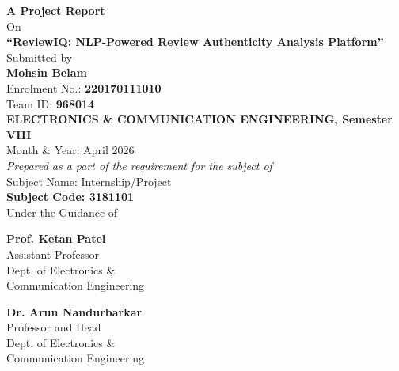 \documentclass[12pt,a4paper,oneside]{report}
\begin{document}

\begin{titlepage}
\thispagestyle{empty}
\hypersetup{pageanchor=false}
\begin{center}
\begin{singlespace}

\vspace*{1.2cm}

{\Large \textbf{A Project Report}}\\[14pt]
On\\[14pt]
{\Large \textbf{``ReviewIQ: NLP-Powered Review Authenticity Analysis Platform''}}\\[36pt]

Submitted by\\[8pt]
\textbf{Mohsin Belam}\\
Enrolment No.: \textbf{220170111010}\\
Team ID: \textbf{968014}\\
\textbf{ELECTRONICS \& COMMUNICATION ENGINEERING, Semester VIII}\\
Month \& Year: April 2026\\[24pt]

\textit{Prepared as a part of the requirement for the subject of}\\[6pt]
Subject Name: Internship/Project\\
\textbf{Subject Code: 3181101}\\[30pt]

Under the Guidance of\\[12pt]
\noindent
\begin{minipage}[t]{0.45\textwidth}
\centering
\textbf{Prof. Ketan Patel}\\
Assistant Professor\\
Dept. of Electronics \&\\
Communication Engineering
\end{minipage}
\hfill
\begin{minipage}[t]{0.45\textwidth}
\centering
\textbf{Dr. Arun Nandurbarkar}\\
Professor and Head\\
Dept. of Electronics \&\\
Communication Engineering
\end{minipage}


\end{singlespace}
\end{center}
\end{titlepage}
\end{document}
